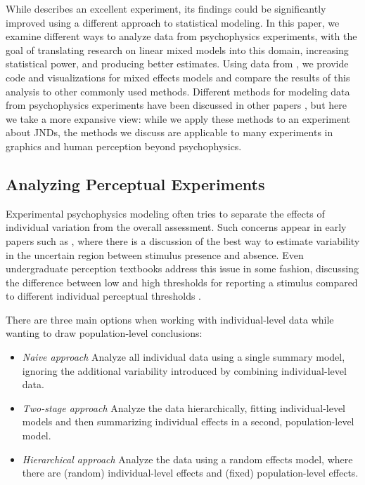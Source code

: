 While \cite{JNDVIS21} describes an excellent experiment, its findings could be significantly improved using a different approach to statistical modeling. 
In this paper, we examine different ways to analyze data from psychophysics experiments, with the goal of translating research on linear mixed models into this domain, increasing statistical power, and producing better estimates. 
Using data from \cite{JNDVIS21}, we provide code and visualizations for mixed effects models and compare the results of this analysis to other commonly used methods. 
Different methods for modeling data from psychophysics experiments have been discussed in other papers \cite{kayWeberLawSecond2016}, but here we take a more expansive view: while we apply these methods to an experiment about JNDs, the methods we discuss are applicable to many experiments in graphics and human perception beyond psychophysics.

\subsection{Analyzing Perceptual Experiments}

Experimental psychophysics modeling often tries to separate the effects of individual variation from the overall assessment. 
Such concerns appear in early papers such as \cite{treisman_relation_1966}, where there is a discussion of the best way to estimate variability in the uncertain region between stimulus presence and absence. 
Even undergraduate perception textbooks address this issue in some fashion, discussing the difference between low and high thresholds for reporting a stimulus compared to different individual perceptual thresholds \cite[pg 18]{goldstein_sensation_2010}. 

There are three main options when working with individual-level data while wanting to draw population-level conclusions: 
\begin{itemize}
    \item \emph{Naive approach} Analyze all individual data using a single summary model, ignoring the additional variability introduced by combining individual-level data. 
    \item \emph{Two-stage approach} Analyze the data hierarchically, fitting individual-level models and then summarizing individual effects in a second, population-level model.
    \item \emph{Hierarchical approach} Analyze the data using a random effects model, where there are (random) individual-level effects and (fixed) population-level effects.
\end{itemize}

